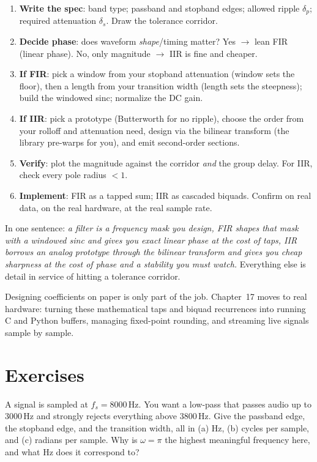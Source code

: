 \begin{enumerate}
\item \textbf{Write the spec}: band type; passband and stopband edges; allowed
ripple $\delta_p$; required attenuation $\delta_s$. Draw the tolerance corridor.
\item \textbf{Decide phase}: does waveform \emph{shape}/timing matter? Yes $\to$
lean FIR (linear phase). No, only magnitude $\to$ IIR is fine and cheaper.
\item \textbf{If FIR}: pick a window from your stopband attenuation (window sets
the floor), then a length from your transition width (length sets the steepness);
build the windowed sinc; normalize the DC gain.
\item \textbf{If IIR}: pick a prototype (Butterworth for no ripple), choose the
order from your rolloff and attenuation need, design via the bilinear transform (the
library pre-warps for you), and emit second-order sections.
\item \textbf{Verify}: plot the magnitude against the corridor \emph{and} the
group delay. For IIR, check every pole radius $< 1$.
\item \textbf{Implement}: FIR as a tapped sum; IIR as cascaded biquads. Confirm on
real data, on the real hardware, at the real sample rate.
\end{enumerate}

\begin{recoverybox}
In one sentence: \emph{a filter is a frequency mask you design, FIR
shapes that mask with a windowed sinc and gives you exact linear phase at the cost
of taps, IIR borrows an analog prototype through the bilinear transform and gives
you cheap sharpness at the cost of phase and a stability you must watch.} Everything
else is detail in service of hitting a tolerance corridor.

Designing coefficients on paper is only part of the job. Chapter~17 moves to real
hardware: turning these mathematical taps and biquad recurrences into running C and Python
buffers, managing fixed-point rounding, and streaming live signals sample by sample.
\end{recoverybox}

\section{Exercises}
\label{ch16:exercises}

\begin{exercise}
A signal is sampled at $f_s = 8000$\,Hz. You want a low-pass that passes audio up
to $3000$\,Hz and strongly rejects everything above $3800$\,Hz. Give the passband
edge, the stopband edge, and the transition width, all in (a) Hz, (b) cycles per
sample, and (c) radians per sample. Why is $\omega = \pi$ the highest meaningful
frequency here, and what Hz does it correspond to?
\end{exercise}

